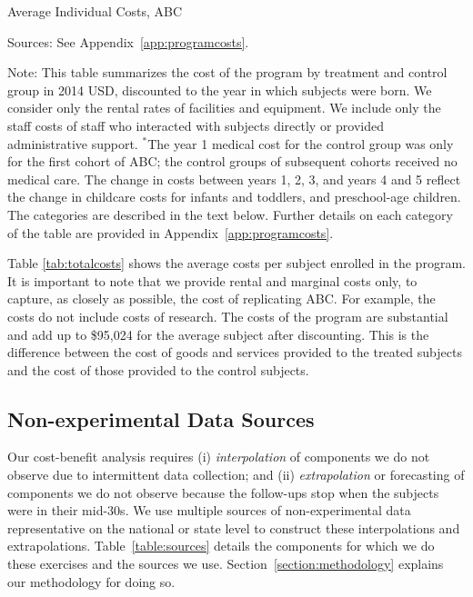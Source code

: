 \begin{table}[H]
\begin{threeparttable}
\caption{Average Individual Costs, ABC} \label{tab:totalcosts}
\footnotesize

\begin{tablenotes}
\footnotesize
\item Sources: See Appendix~\ref{app:programcosts}.\\
\item Note: This table summarizes the cost of the program by treatment and control group in 2014 USD, discounted to the year in which subjects were born. We consider only the rental rates of facilities and equipment. We include only the staff costs of staff who interacted with subjects directly or provided administrative support. $^{*}$The year 1 medical cost for the control group was only for the first cohort of ABC; the control groups of subsequent cohorts received no medical care. The change in costs between years 1, 2, 3, and years 4 and 5 reflect the change in childcare costs for infants and toddlers, and preschool-age children. The categories are described in the text below. Further details on each category of the table are provided in Appendix~\ref{app:programcosts}.
\end{tablenotes}
\end{threeparttable}
\end{table}


\noindent Table \ref{tab:totalcosts} shows the average costs per subject enrolled
in the program. It is important to note that we provide rental and marginal costs only, to capture, as closely as possible, the cost of replicating ABC.  For example, the costs do not include costs of research. The costs of the program are substantial and add up to \$95,024 for the average subject after discounting. This is the difference between the cost of goods and services provided to the treated subjects and the cost of those provided to the control subjects. \\

\subsection{Non-experimental Data Sources}

\noindent Our cost-benefit analysis requires (i) \textit{interpolation} of components we do not observe due to intermittent data collection; and (ii) \textit{extrapolation} or forecasting of components we do not observe because the follow-ups stop when the subjects were in their mid-30s. We use multiple sources of non-experimental data representative on the national or state level to construct these interpolations and extrapolations. Table~\ref{table:sources} details the components for which we do these exercises and the sources we use. Section~\ref{section:methodology} explains our methodology for doing so. 

